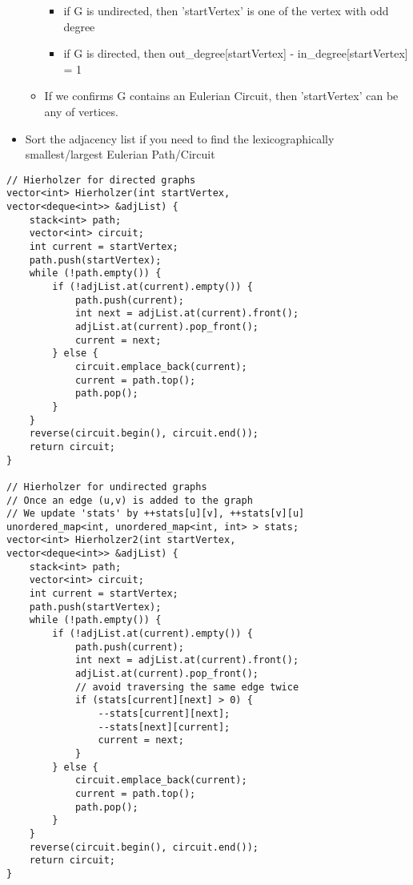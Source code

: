 \documentclass[10pt]{article}{\twocolumn}
\begin{document}
\begin{itemize}
\begin{itemize}
        \begin{itemize}
            \setlength\itemsep{0.1em}
            \item if G is undirected, then 'startVertex' is one of the vertex with odd degree
            \item if G is directed, then out\_degree[startVertex] - in\_degree[startVertex] = 1
        \end{itemize}
        \item If we confirms G contains an Eulerian Circuit, then 'startVertex' can be any of vertices.
    \end{itemize}
    \item Sort the adjacency list if you need to find the lexicographically smallest/largest Eulerian Path/Circuit
\end{itemize}
\begin{lstlisting}
// Hierholzer for directed graphs
vector<int> Hierholzer(int startVertex, 
vector<deque<int>> &adjList) {
    stack<int> path;
    vector<int> circuit;
    int current = startVertex;
    path.push(startVertex);
    while (!path.empty()) {
        if (!adjList.at(current).empty()) {
            path.push(current);
            int next = adjList.at(current).front();
            adjList.at(current).pop_front();
            current = next;
        } else {
            circuit.emplace_back(current);
            current = path.top();
            path.pop();
        }
    }
    reverse(circuit.begin(), circuit.end());
    return circuit;
}

// Hierholzer for undirected graphs
// Once an edge (u,v) is added to the graph
// We update 'stats' by ++stats[u][v], ++stats[v][u]
unordered_map<int, unordered_map<int, int> > stats;
vector<int> Hierholzer2(int startVertex, 
vector<deque<int>> &adjList) {
    stack<int> path;
    vector<int> circuit;
    int current = startVertex;
    path.push(startVertex);
    while (!path.empty()) {
        if (!adjList.at(current).empty()) {
            path.push(current);
            int next = adjList.at(current).front();
            adjList.at(current).pop_front();
            // avoid traversing the same edge twice
            if (stats[current][next] > 0) {
                --stats[current][next];
                --stats[next][current];
                current = next;
            }
        } else {
            circuit.emplace_back(current);
            current = path.top();
            path.pop();
        }
    }
    reverse(circuit.begin(), circuit.end());
    return circuit;
}
\end{lstlisting}
\end{document}
